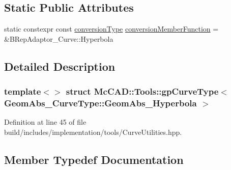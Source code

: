 \subsection*{Static Public Attributes}
\begin{DoxyCompactItemize}
\item 
static constexpr const \hyperlink{structMcCAD_1_1Tools_1_1gpCurveType_3_01GeomAbs__CurveType_1_1GeomAbs__Hyperbola_01_4_a0b812f11998e2a5801e6a5b91e1b303c}{conversion\+Type} \hyperlink{structMcCAD_1_1Tools_1_1gpCurveType_3_01GeomAbs__CurveType_1_1GeomAbs__Hyperbola_01_4_a0ab5b7131b16601493f3745dba0dfdf1}{conversion\+Member\+Function} = \&B\+Rep\+Adaptor\+\_\+\+Curve\+::\+Hyperbola
\end{DoxyCompactItemize}


\subsection{Detailed Description}
\subsubsection*{template$<$$>$\newline
struct Mc\+C\+A\+D\+::\+Tools\+::gp\+Curve\+Type$<$ Geom\+Abs\+\_\+\+Curve\+Type\+::\+Geom\+Abs\+\_\+\+Hyperbola $>$}



Definition at line 45 of file build/includes/implementation/tools/\+Curve\+Utilities.\+hpp.



\subsection{Member Typedef Documentation}
\mbox{\label{structMcCAD_1_1Tools_1_1gpCurveType_3_01GeomAbs__CurveType_1_1GeomAbs__Hyperbola_01_4_a0b812f11998e2a5801e6a5b91e1b303c}} 
